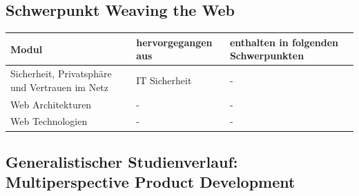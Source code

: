 \subsection{Schwerpunkt Weaving the
Web}\label{schwerpunkt-weaving-the-web}

\begin{longtable}[]{@{}lll@{}}
\toprule
Modul & hervorgegangen aus & enthalten in folgenden
Schwerpunkten\tabularnewline
\midrule
\endhead
Sicherheit, Privatsphäre und Vertrauen im Netz & IT Sicherheit &
-\tabularnewline
Web Architekturen & - & -\tabularnewline
Web Technologien & - & -\tabularnewline
\bottomrule
\end{longtable}

\subsection{Generalistischer Studienverlauf: Multiperspective Product
Development}\label{generalistischer-studienverlauf-multiperspective-product-development}

